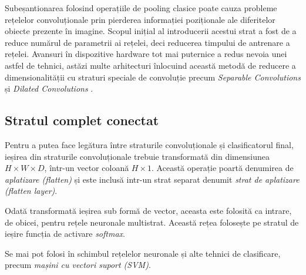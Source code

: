 Subeșantionarea folosind operațiile de pooling clasice poate cauza probleme rețelelor convoluționale prin pierderea informației poziționale ale diferitelor obiecte prezente în imagine. Scopul inițial al introducerii acestui strat a fost de a reduce numărul de parametrii ai rețelei, deci reducerea timpului de antrenare a rețelei. Avansuri în dispozitive hardware tot mai puternice a redus nevoia unei astfel de tehnici, astăzi multe arhitecturi înlocuind această metodă de reducere a dimensionalității cu straturi speciale de convoluție precum \textit{Separable Convolutions} și \textit{Dilated Convolutions} \cite{online:cnn-types}.

\subsection*{Stratul complet conectat}\label{subsec:strat-complet-con}
Pentru a putea face legătura între straturile convoluționale și clasificatorul final, ieșirea din straturile convoluționale trebuie transformată din dimensiunea $H\times W\times D$, într-un vector coloană $H\times1$. Această operație poartă denumirea de \textit{aplatizare (flatten)} și este inclusă intr-un strat separat denumit \textit{strat de aplatizare (flatten layer)}.

Odată transformată ieșirea sub formă de vector, aceasta este folosită ca intrare, de obicei, pentru rețele neuronale multistrat. Această rețea folosește pe stratul de ieșire funcția de activare \textit{softmax}.

Se mai pot folosi în schimbul rețelelor neuronale și alte tehnici de clasificare, precum \textit{mașini cu vectori suport (SVM)}.

